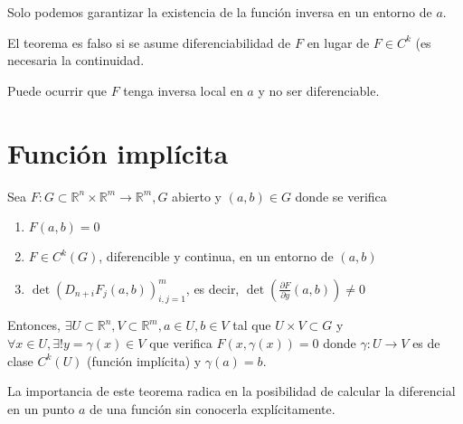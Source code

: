 \begin{dem}

\end{dem}

\begin{obs}
Solo podemos garantizar la existencia de la función inversa en un entorno de $a.$
\end{obs}

\begin{obs}
El teorema es falso si se asume diferenciabilidad de $F$ en lugar de $F\in C^k$ (es necesaria la continuidad. 
\end{obs}

\begin{obs}
Puede ocurrir que $F$ tenga inversa local en $a$ y no ser diferenciable.
\end{obs}

\section{Función implícita}

\begin{theo}
Sea $F:G\subset\mathbb{R}^n\times\mathbb{R}^m\rightarrow\mathbb{R}^m, G$ abierto y $(a,b)\in G$ donde se verifica 

\begin{enumerate}[label=(\roman*)]
    \item $F(a,b) = 0$
    \item $F\in C^k(G)$, diferencible y continua, en un entorno de $(a,b)$ 
    \item $\det(D_{n+i}F_j(a,b))^m_{i,j=1}$, es decir, $\det(\frac{\partial{F}}{\partial{y}}(a,b)) \neq 0 $
\end{enumerate}

Entonces, $\exists U \subset\mathbb{R}^n, V \subset\mathbb{R}^m, a\in U, b\in V$ tal que $U\times V\subset G$ y $\forall x \in U ,\exists !y=\gamma(x) \in V$ que verifica $F(x,\gamma(x)) = 0$ donde $\gamma: U \rightarrow V$ es de clase $C^k(U)$ (función implícita) y $\gamma(a) = b$.
\end{theo}

\begin{dem}

\end{dem}

\begin{obs}
La importancia de este teorema radica en la posibilidad de calcular la diferencial en un punto $a$ de una función sin conocerla explícitamente.
\end{obs}

